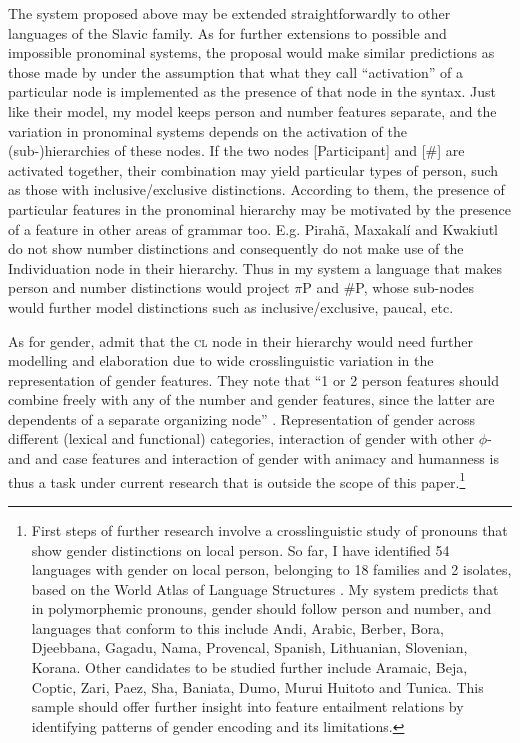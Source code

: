 \documentclass[output=paper,colorlinks,citecolor=brown]{langscibook}
\begin{document}
The system proposed above may be extended straightforwardly to other languages of the Slavic family. As for further extensions to possible and impossible pronominal systems, the proposal would make similar predictions as those made by \citet{harleyritter02} under the assumption that what they call ``activation'' of a particular node is implemented as the presence of that node in the syntax. 
Just like their model, my model keeps person and number features separate, and the variation in pronominal systems depends on the activation of the \mbox{(sub-)}hierarchies of these nodes.
If the two nodes [Participant] and [\#] are activated together, their combination may yield particular types of person, such as those with inclusive/exclusive distinctions. According to them, the presence of particular features in the pronominal hierarchy may be motivated by the presence of a feature in other areas of grammar too. E.g. Pirah\~{a}, Maxakal{\'{i}} and Kwakiutl do not show number distinctions and consequently do not make use of the Individuation node in their hierarchy. Thus in my system a language that makes person and number distinctions would project $\pi$P and \#P, whose sub-nodes would further model distinctions such as inclusive/exclusive, paucal, etc.

As for gender, \citeauthor{harleyritter02} admit that the \textsc{cl} node in their hierarchy would need further modelling and elaboration due to wide crosslinguistic variation in the representation of gender features. They note that ``1\fst{} or 2\nd{} person features should combine freely with any of the number and gender features, since the latter are dependents of a separate organizing node'' \citep[508]{harleyritter02}. Representation of gender across different (lexical and functional) categories, interaction of gender with other $\phi$- and and case features and interaction of gender with animacy and humanness is thus a task under current research that is outside the scope of this paper.\footnote{First steps of further research involve a crosslinguistic study of pronouns that show gender distinctions on local person. So far, I have identified 54 languages with gender on local person, belonging to 18 families and 2 isolates, based on the World Atlas of Language Structures \citep{siewierska13genderpronouns}. My system predicts that in polymorphemic pronouns, gender should follow person and number, and languages that conform to this include Andi, Arabic, Berber, Bora, Djeebbana, Gagadu, Nama, Provencal, Spanish, Lithuanian, Slovenian, Korana. Other candidates to be studied further include Aramaic, Beja, Coptic, Zari, Paez, Sha, Baniata, Dumo, Murui Huitoto and Tunica. This sample should offer further insight into feature entailment relations by identifying patterns of gender encoding and its limitations.}
\end{document}
